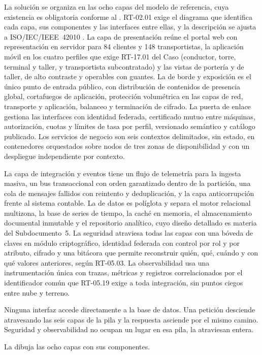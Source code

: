 La solución se organiza en las ocho capas del modelo de referencia, cuya existencia es obligatoria
conforme al . RT-02.01 exige el diagrama que identifica cada capa, sus
componentes y las interfaces entre ellas, y la descripción se ajusta a ISO/IEC/IEEE~42010
\parencite{iso42010}. La capa de presentación reúne el portal web con representación en servidor para 84 clientes y 148
transportistas, la aplicación móvil en los cuatro perfiles que exige RT-17.01 del Caso (conductor, torre,
terminal y taller, y transportista subcontratado) y las vistas de portería y de taller, de alto
contraste y operables con guantes. La de borde y exposición es el único punto de entrada público, con
distribución de contenidos de presencia global, cortafuegos de aplicación, protección volumétrica en las
capas de red, transporte y aplicación, balanceo y terminación de cifrado. La puerta de enlace gestiona
las interfaces con identidad federada, certificado mutuo entre máquinas, autorización, cuotas y límites
de tasa por perfil, versionado semántico y catálogo publicado. Los servicios de negocio son seis
contextos delimitados, sin estado, en contenedores orquestados sobre nodos de tres zonas de
disponibilidad y con un despliegue independiente por contexto.

La capa de integración y eventos tiene un flujo de telemetría para la ingesta masiva, un bus
transaccional con orden garantizado dentro de la partición, una cola de mensajes fallidos con reintento
y deduplicación, y la capa anticorrupción frente al sistema contable. La de datos es políglota y separa
el motor relacional multizona, la base de series de tiempo, la caché en memoria, el almacenamiento
documental inmutable y el repositorio analítico, cuyo diseño detallado es materia del Subdocumento~5. La
seguridad atraviesa todas las capas con una bóveda de claves en módulo criptográfico, identidad federada
con control por rol y por atributo, cifrado y una bitácora que permite reconstruir quién, qué, cuándo y
con qué valores anteriores, según RT-05.03. La observabilidad usa una instrumentación única con trazas,
métricas y registros correlacionados por el identificador común que RT-05.19 exige a toda integración,
sin puntos ciegos entre nube y terreno.

Ninguna interfaz accede directamente a la base de datos. Una petición desciende atravesando las seis
capas de la pila y la respuesta asciende por el mismo camino. Seguridad y observabilidad no ocupan un
lugar en esa pila, la atraviesan entera.

La  dibuja las ocho capas con sus componentes.


